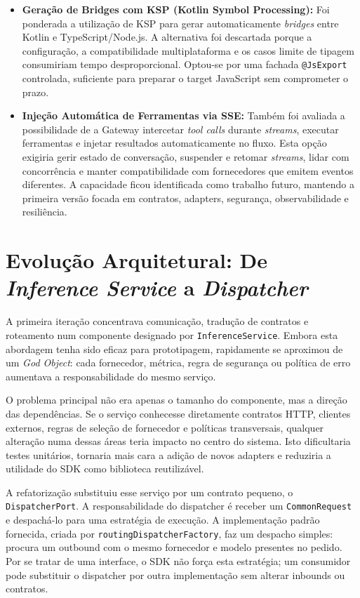 \documentclass[11pt,a4paper]{report}
\begin{document}
    \begin{itemize}
        \item \textbf{Geração de Bridges com KSP (Kotlin Symbol Processing):} Foi ponderada a utilização de KSP para gerar automaticamente \textit{bridges} entre Kotlin e TypeScript/Node.js. A alternativa foi descartada porque a configuração, a compatibilidade multiplataforma e os casos limite de tipagem consumiriam tempo desproporcional. Optou-se por uma fachada \texttt{@JsExport} controlada, suficiente para preparar o target JavaScript sem comprometer o prazo.
        \item \textbf{Injeção Automática de Ferramentas via SSE:} Também foi avaliada a possibilidade de a Gateway intercetar \textit{tool calls} durante \textit{streams}, executar ferramentas e injetar resultados automaticamente no fluxo. Esta opção exigiria gerir estado de conversação, suspender e retomar \textit{streams}, lidar com concorrência e manter compatibilidade com fornecedores que emitem eventos diferentes. A capacidade ficou identificada como trabalho futuro, mantendo a primeira versão focada em contratos, adapters, segurança, observabilidade e resiliência.
    \end{itemize}

    \section{Evolução Arquitetural: De \textit{Inference Service} a \textit{Dispatcher}}
    A primeira iteração concentrava comunicação, tradução de contratos e roteamento num componente designado por \texttt{InferenceService}. Embora esta abordagem tenha sido eficaz para prototipagem, rapidamente se aproximou de um \textit{God Object}: cada fornecedor, métrica, regra de segurança ou política de erro aumentava a responsabilidade do mesmo serviço.

    O problema principal não era apenas o tamanho do componente, mas a direção das dependências. Se o serviço conhecesse diretamente contratos HTTP, clientes externos, regras de seleção de fornecedor e políticas transversais, qualquer alteração numa dessas áreas teria impacto no centro do sistema. Isto dificultaria testes unitários, tornaria mais cara a adição de novos adapters e reduziria a utilidade do SDK como biblioteca reutilizável.

    A refatorização substituiu esse serviço por um contrato pequeno, o \texttt{DispatcherPort}. A responsabilidade do dispatcher é receber um \texttt{CommonRequest} e despachá-lo para uma estratégia de execução. A implementação padrão fornecida, criada por \texttt{routingDispatcherFactory}, faz um despacho simples: procura um outbound com o mesmo fornecedor e modelo presentes no pedido. Por se tratar de uma interface, o SDK não força esta estratégia; um consumidor pode substituir o dispatcher por outra implementação sem alterar inbounds ou contratos.
\end{document}
